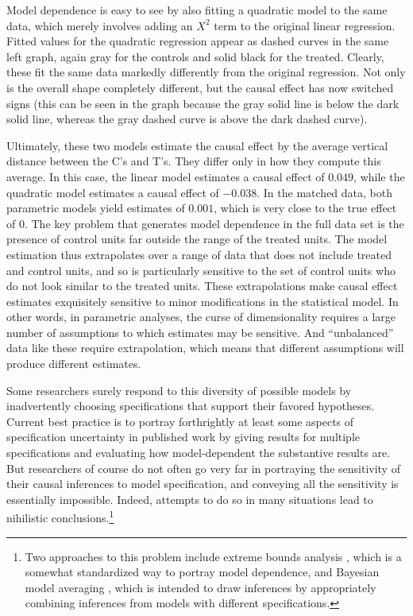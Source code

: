 \documentclass[11pt,titlepage]{article}
\begin{document}
Model dependence is easy to see by also fitting a quadratic model to
the same data, which merely involves adding an $X^2$ term to the
original linear regression.  Fitted values for the quadratic
regression appear as dashed curves in the same left graph, again gray
for the controls and solid black for the treated.  Clearly, these fit
the same data markedly differently from the original regression.  Not
only is the overall shape completely different, but the causal effect
has now switched signs (this can be seen in the
graph because the gray solid line is below the dark solid
line, whereas the gray dashed curve is above the dark
dashed curve).

Ultimately, these two models estimate the causal effect by the average
vertical distance between the C's and T's.  They differ only in how
they compute this average.  In this case, the linear model estimates
a causal effect of $0.049$, while the quadratic model estimates a causal
effect of $-0.038$.  In the matched data, both parametric models yield 
estimates of $0.001$, which is very close to the true effect of $0$. 
The key problem that generates model dependence in the full data set
is the presence of control units far outside the range of 
the treated units. 
The model estimation thus extrapolates over a range of data that does not include
treated and control units, and so is particularly sensitive to the set of control 
units who do not look similar to the treated units.
These extrapolations make causal
effect estimates exquisitely sensitive to minor modifications in the
statistical model.  In other words, in parametric analyses, the curse
of dimensionality requires a large number of assumptions to which
estimates may be sensitive.  And ``unbalanced'' data like these
require extrapolation, which means that different assumptions will
produce different estimates.

Some researchers surely respond to this diversity of possible models
by inadvertently choosing specifications that support their favored
hypotheses.  Current best practice is to portray forthrightly at least
some aspects of specification uncertainty in published work by giving
results for multiple specifications and evaluating how model-dependent
the substantive results are.  But researchers of course do not often
go very far in portraying the sensitivity of their causal inferences
to model specification, and conveying all the sensitivity is
essentially impossible.  Indeed, attempts to do so in many situations
lead to nihilistic conclusions.\footnote{Two approaches to this
  problem include extreme bounds analysis \citep{Leamer78}, which is a
  somewhat standardized way to portray model dependence, and Bayesian
  model averaging \citep{HoeMadRaf99,ImaKin04}, which is intended to
  draw inferences by appropriately combining inferences from models
  with different specifications.}
\end{document}
